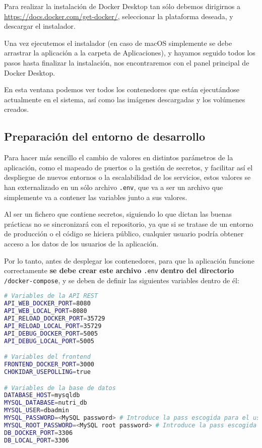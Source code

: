
Para realizar la instalación de Docker Desktop tan sólo debemos dirigirnos a \url{https://docs.docker.com/get-docker/}, seleccionar la plataforma deseada, y descargar el instalador.


Una vez ejecutemos el instalador (en caso de macOS simplemente se debe arrastrar la aplicación a la carpeta de Aplicaciones), y hayamos seguido todos los pasos hasta finalizar la instalación, nos encontraremos con el panel principal de Docker Desktop. 


En esta ventana podemos ver todos los contenedores que están ejecutándose actualmente en el sistema, así como las imágenes descargadas y los volúmenes creados.

\subsection{Preparación del entorno de desarrollo} \label{entorno-desarrollo}

Para hacer más sencillo el cambio de valores en distintos parámetros de la aplicación, como el mapeado de puertos o la gestión de secretos, y facilitar así el despliegue de nuevos entornos o la escalabilidad de los servicios, estos valores se han externalizado en un sólo archivo \verb,.env,, que va a ser un archivo que simplemente va a contener las variables junto a sus valores. 

Al ser un fichero que contiene secretos, siguiendo lo que dictan las buenas prácticas no se sincronizará con el repositorio, ya que si se tratase de un entorno de producción o el código se hiciera público, cualquier usuario podría obtener acceso a los datos de los usuarios de la aplicación.

Por lo tanto, antes de desplegar los contenedores, para que la aplicación funcione correctamente \textbf{se debe crear este archivo} \verb,.env, \textbf{dentro del directorio} \verb,/docker-compose,, y se deben de definir las siguientes variables dentro de él:

\begin{lstlisting}[language=Bash]
# Variables de la API REST
API_WEB_DOCKER_PORT=8080
API_WEB_LOCAL_PORT=8080
API_RELOAD_DOCKER_PORT=35729
API_RELOAD_LOCAL_PORT=35729
API_DEBUG_DOCKER_PORT=5005
API_DEBUG_LOCAL_PORT=5005

# Variables del frontend
FRONTEND_DOCKER_PORT=3000
CHOKIDAR_USEPOLLING=true

# Variables de la base de datos
DATABASE_HOST=mysqldb
MYSQL_DATABASE=nutri_db
MYSQL_USER=dbadmin
MYSQL_PASSWORD=<MySQL password> # Introduce la pass escogida para el usuario creado en el paso anterior
MYSQL_ROOT_PASSWORD=<MySQL root password> # Introduce la pass escogida para el usuario root de MySQL
DB_DOCKER_PORT=3306
DB_LOCAL_PORT=3306
\end{lstlisting}


